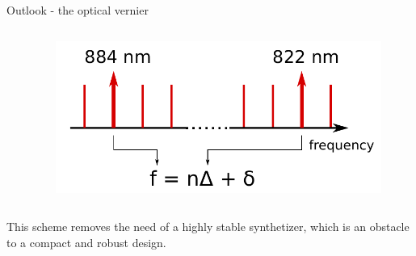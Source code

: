 \begin{block}{Outlook - the optical vernier}
\begin{columns}
\begin{column}{0.60\textwidth}
    \end{column}
    \begin{column}{0.39\textwidth}
      \begin{figure}
        \begin{center}
          \includegraphics[width=1.0\textwidth]{figures/vernier}
        \end{center}
      \end{figure}
    \end{column}
  \end{columns}
  This scheme removes the need of a highly stable synthetizer, which is an obstacle to a compact and robust design.
\end{block}
